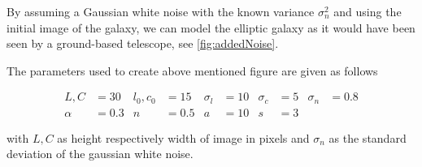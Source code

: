By assuming a Gaussian white noise with the known variance $\sigma_n^2$ and using the initial image of the galaxy, we can model the elliptic galaxy as it would have been seen by a ground-based telescope, see \cref{fig:addedNoise}.



The parameters used to create above mentioned figure are given as follows


	\begin{align*}
		L, C & = 30 & l_0, c_0 & = 15 & \sigma_l & = 10 & \sigma_c & = 5 & \sigma_n & = 0.8 \\
		\alpha & = 0.3 & n & = 0.5 & a & = 10 & s & = 3 
	\end{align*}

with $L,C$ as height respectively width of image in pixels and $\sigma_n$ as the standard deviation of the gaussian white noise.




